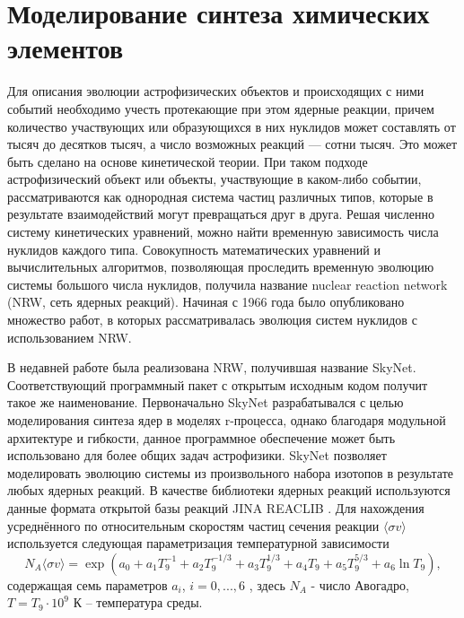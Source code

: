 \documentclass[14pt, a4paper]{article}
\begin{document}
\section{Моделирование синтеза химических элементов}

Для описания эволюции астрофизических объектов и происходящих с ними событий необходимо учесть протекающие при этом ядерные реакции, причем количество участвующих или образующихся в них нуклидов может составлять от тысяч до десятков тысяч, а число возможных реакций --- сотни тысяч. Это может быть сделано на основе кинетической теории. При таком подходе астрофизический объект или объекты, участвующие в каком-либо событии, рассматриваются как однородная система частиц различных типов, которые в результате взаимодействий могут превращаться друг в друга. Решая численно систему кинетических уравнений, можно найти временную зависимость числа нуклидов каждого типа. Совокупность математических уравнений и вычислительных алгоритмов, позволяющая проследить временную эволюцию системы большого числа нуклидов, получила название nuclear reaction network  (NRW, сеть ядерных реакций). Начиная с 1966 года \cite{nrw} было опубликовано множество работ, в которых рассматривалась эволюция систем нуклидов с использованием NRW.

В недавней работе \cite{skynet} была реализована NRW, получившая название SkyNet. Соответствующий программный пакет с открытым исходным кодом получит такое же наименование.
Первоначально SkyNet разрабатывался с целью моделирования синтеза ядер в моделях r-процесса, однако благодаря модульной архитектуре и гибкости, данное программное обеспечение может быть использовано для более общих задач астрофизики. SkyNet позволяет моделировать эволюцию системы из произвольного набора изотопов в  результате любых ядерных реакций. В качестве библиотеки ядерных реакций используются данные формата открытой базы реакций JINA REACLIB \cite{jina}. Для нахождения усреднённого по относительным скоростям частиц сечения реакции $\langle \sigma v \rangle$ используется следующая параметризация температурной зависимости
\begin{equation}
\label{eq:system}
N_{A}\langle \sigma v \rangle = \exp (a_0 + a_1 T_9^{-1} + a_2 T_9^{-1/3} +
a_3 T_9^{1/3} + a_4 T_9 + a_5 T_9^{5/3} + a_6 \ln T_9),
\end{equation}
содержащая семь параметров $a_i$, $i=0,...,6$ \cite{a7}, здесь $N_{A}$ - число Авогадро, $T=T_9\cdot 10^9$ К -- температура среды.

\end{document}
